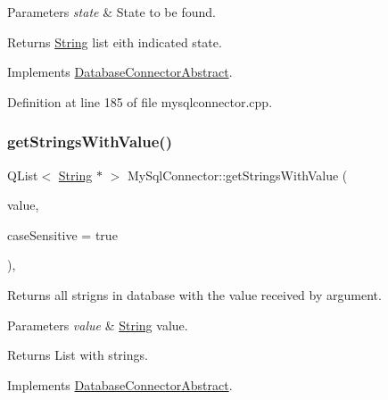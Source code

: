 \begin{DoxyParams}{Parameters}
{\em state} & State to be found. \\
\hline
\end{DoxyParams}
\begin{DoxyReturn}{Returns}
\mbox{\hyperlink{classString}{String}} list eith indicated state. 
\end{DoxyReturn}


Implements \mbox{\hyperlink{classDatabaseConnectorAbstract_a74952c7e14c891e33c84995066003c5a}{Database\+Connector\+Abstract}}.



Definition at line 185 of file mysqlconnector.\+cpp.

\mbox{\label{classMySqlConnector_ae7440816a5bda9e63ea526656c4001f5}} 
\subsubsection{\texorpdfstring{get\+Strings\+With\+Value()}{getStringsWithValue()}}
{\footnotesize\ttfamily Q\+List$<$ \mbox{\hyperlink{classString}{String}} $\ast$ $>$ My\+Sql\+Connector\+::get\+Strings\+With\+Value (\begin{DoxyParamCaption}\item[{const Q\+String \&}]{value,  }\item[{bool}]{case\+Sensitive = {\ttfamily true} }\end{DoxyParamCaption})\hspace{0.3cm}{\ttfamily [override]}, {\ttfamily [virtual]}}



Returns all strigns in database with the value received by argument. 


\begin{DoxyParams}{Parameters}
{\em value} & \mbox{\hyperlink{classString}{String}} value. \\
\hline
\end{DoxyParams}
\begin{DoxyReturn}{Returns}
List with strings. 
\end{DoxyReturn}


Implements \mbox{\hyperlink{classDatabaseConnectorAbstract_a1d33547045c5f8619f44290c932edb1b}{Database\+Connector\+Abstract}}.



